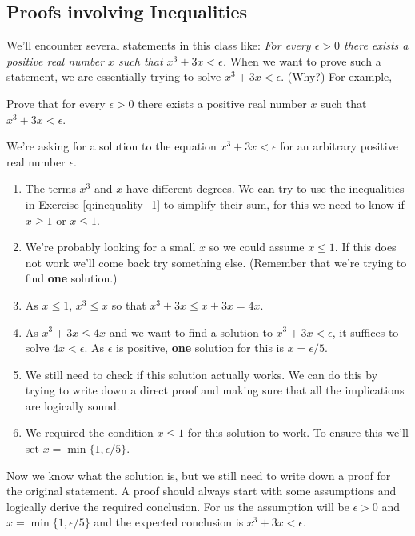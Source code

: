 \subsection{Proofs involving Inequalities}
We'll encounter several statements in this class like: {\it For every $\epsilon> 0$ there exists a positive real number $x$ such that $x^3 + 3x < \epsilon$.} When we want to prove such a statement, we are essentially trying to solve $x^3 + 3x < \epsilon$. (Why?) For example,\\
\begin{q}
	\label{q:sample_problem_inequality_1}
	Prove that for every $\epsilon > 0$ there exists a positive real number $x$ such that $x^3 + 3x < \epsilon$.
\end{q}
\noindent We're asking for a solution to the equation $x^3 + 3x < \epsilon$ for an arbitrary positive real number $\epsilon$.
\begin{enumerate}
	\item The terms $x^3$ and $x$ have different degrees. We can try to use the inequalities in Exercise \ref{q:inequality_1} to simplify their sum, for this we need to know if $x \ge 1$ or $x \le 1$.
	\item We're probably looking for a small  $x$ so we could assume $x \le 1$. If this does not work we'll come back try something else. (Remember that we're trying to find {\bf one} solution.)
	\item As $x \le 1$, $x^3 \le x$ so that
		$x^3 + 3x \le x + 3x= 4x$.
	\item	As $x^3 + 3x \le 4x$ and we want to find a solution to $x^3 + 3x < \epsilon$, it suffices to solve $4x < \epsilon$. As $\epsilon$ is positive, \textbf{one} solution for this is $x = \epsilon / 5$.
	\item We still need to check if this solution actually works. We can do this by trying to write down a direct proof and making sure that all the implications are logically sound.
	\item We required the condition $x \le 1$ for this solution to work. To ensure this we'll set $x = \min \{ 1, {\epsilon}/{5}\}$.
\end{enumerate}

Now we know what the solution is, but we still need to write down a proof for the original statement. A proof should always start with some assumptions and logically derive the required conclusion. For us the assumption will be $\epsilon > 0$ and $x = \min \{ 1, {\epsilon}/{5}\}$ and the expected conclusion is $x^3 + 3x < \epsilon$.

